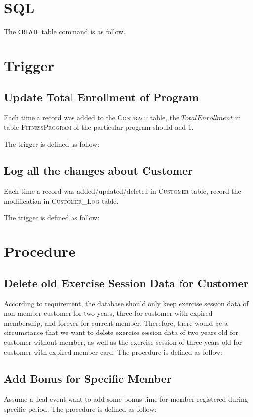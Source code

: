 \documentclass[12pt,letterpaper,titlepage,en-US]{article}
\begin{document}
\section{SQL}
The \texttt{CREATE} table command is as follow.


\section{Trigger}
\subsection{Update Total Enrollment of Program}
Each time a record was added to the \textsc{Contract} table,
the $TotalEnrollment$ in table \textsc{FitnessProgram} of the particular program should add 1.

The trigger is defined as follow:


\subsection{Log all the changes about Customer}
Each time a record was added/updated/deleted in \textsc{Customer} table,
record the modification in \textsc{Customer\_Log} table.

The trigger is defined as follow:


\section{Procedure}

\subsection{Delete old Exercise Session Data for Customer}
According to requirement, the database should only keep exercise session data
of non-member customer for two years, three for customer with expired membership,
and forever for current member. Therefore, there would be a circumstance that
we want to delete exercise session data of two years old for customer without member,
as well as the exercise session of three years old for customer with expired member card.
The procedure is defined as follow:


\subsection{Add Bonus for Specific Member}
Assume a deal event want to add some bonus time for member registered during specific period.
The procedure is defined as follow:

\end{document}
